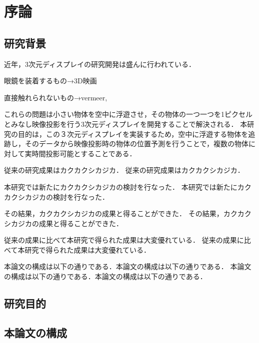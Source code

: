 \chapter{序論}

\section{研究背景}

近年，3次元ディスプレイの研究開発は盛んに行われている．

眼鏡を装着するもの→3D映画

直接触れられないもの→vermeer,

これらの問題は小さい物体を空中に浮遊させ，その物体の一つ一つを1ピクセルとみなし映像投影を行う3次元ディスプレイを開発することで解決される．
本研究の目的は，この３次元ディスプレイを実装するため，空中に浮遊する物体を追跡し，そのデータから映像投影時の物体の位置予測を行うことで，複数の物体に対して実時間投影可能とすることである．

従来の研究成果はカクカクシカジカ．
従来の研究成果はカクカクシカジカ．

本研究では新たにカクカクシカジカの検討を行なった．
本研究では新たにカクカクシカジカの検討を行なった．

その結果，カクカクシカジカの成果と得ることができた．
その結果，カクカクシカジカの成果と得ることができた．

従来の成果に比べて本研究で得られた成果は大変優れている．
従来の成果に比べて本研究で得られた成果は大変優れている．

本論文の構成は以下の通りである．本論文の構成は以下の通りである．
本論文の構成は以下の通りである．本論文の構成は以下の通りである．
\cite{tokodai-xyz2015}

\section{研究目的}

\section{本論文の構成}
